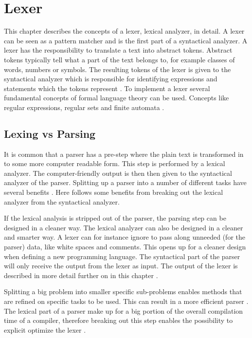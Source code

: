 \chapter{Lexer \label{chap:lexer}}
This chapter describes the concepts of a lexer, lexical analyzer, in detail. A
lexer can be seen as a pattern matcher and is the first part of a syntactical
analyzer. A lexer has the responsibility to translate a text into abstract
tokens. Abstract tokens typically tell what a part of the text belongs to, for
example classes of words, numbers or symbols. The resulting tokens of the lexer
is given to the syntactical analyzer which is responsible for identifying
expressions and statements which the tokens represent \cite{sebesta2012}.
To implement a lexer several fundamental concepts of
formal language theory can be used. Concepts like regular expressions, regular
sets and finite automata \cite{Aho1990}.

\section{Lexing vs Parsing}
It is common that a parser has a pre-step where the plain text is transformed
in to some more computer readable form. This step is performed by a lexical
analyzer.
The computer-friendly output is then then given to the syntactical analyzer of
the parser. Splitting up a parser into a number of different tasks have several
benefits \cite{sebesta2012}. Here follows some benefits from breaking out the
lexical analyzer from the syntactical analyzer.

If the lexical analysis is stripped out of
the parser, the parsing step can be designed in a cleaner way. The lexical
analyzer can also be designed in a cleaner and smarter way. A lexer can for
instance ignore to pass along unneeded (for the parser) data, like white spaces
and comments. This opens up for a cleaner design when defining a new programming
language. The syntactical part of the parser will only receive the output from
the lexer as input. The output of the lexer is described in more detail further
on in this chapter \cite{Aho2006}.

\newpage

Splitting a big problem into smaller specific sub-problems enables methods that
are refined on specific tasks to be used. This can result in a more efficient
parser \cite{Aho2006}. The lexical part of a parser make up for a big portion
of the overall compilation time of a compiler, therefore breaking out this step
enables the possibility to explicit optimize the lexer \cite{sebesta2012}.

